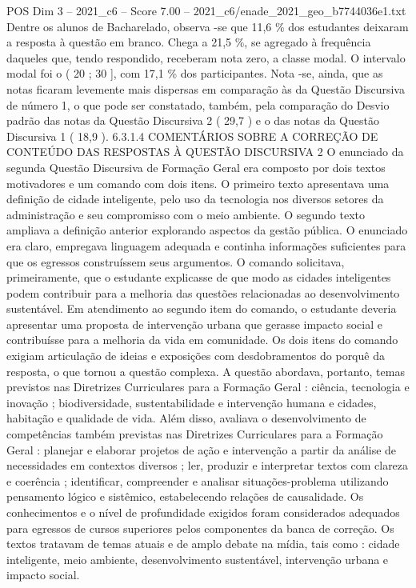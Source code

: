 \begin{textsample}{POS Dim 3 – 2021\_c6 – Score 7.00 – 2021\_c6/enade\_2021\_geo\_b7744036e1.txt}
Dentre os alunos de Bacharelado, observa -se que 11,6 \% dos estudantes deixaram a resposta à questão em branco.
Chega a 21,5 \%, se agregado à frequência daqueles que, tendo respondido, receberam nota zero, a classe modal.
O intervalo modal foi o ( 20 ; 30 ], com 17,1 \% dos participantes.
Nota -se, ainda, que as notas ficaram levemente mais dispersas em comparação às da Questão Discursiva de número 1, o que pode ser constatado, também, pela comparação do Desvio padrão das notas da Questão Discursiva 2 ( 29,7 ) e o das notas da Questão Discursiva 1 ( 18,9 ). 6.3.1.4 COMENTÁRIOS SOBRE A CORREÇÃO DE CONTEÚDO DAS RESPOSTAS À QUESTÃO DISCURSIVA 2 O enunciado da segunda Questão Discursiva de Formação Geral era composto por dois textos motivadores e um comando com dois itens.
O primeiro texto apresentava uma definição de cidade inteligente, pelo uso da tecnologia nos diversos setores da administração e seu compromisso com o meio ambiente.
O segundo texto ampliava a definição anterior explorando aspectos da gestão pública.
O enunciado era claro, empregava linguagem adequada e continha informações suficientes para que os egressos construíssem seus argumentos.
O comando solicitava, primeiramente, que o estudante explicasse de que modo as cidades inteligentes podem contribuir para a melhoria das questões relacionadas ao desenvolvimento sustentável.
Em atendimento ao segundo item do comando, o estudante deveria apresentar uma proposta de intervenção urbana que gerasse impacto social e contribuísse para a melhoria da vida em comunidade.
Os dois itens do comando exigiam articulação de ideias e exposições com desdobramentos do porquê da resposta, o que tornou a questão complexa.
A questão abordava, portanto, temas previstos nas Diretrizes Curriculares para a Formação Geral : ciência, tecnologia e inovação ; biodiversidade, sustentabilidade e intervenção humana e cidades, habitação e qualidade de vida.
Além disso, avaliava o desenvolvimento de competências também previstas nas Diretrizes Curriculares para a Formação Geral : planejar e elaborar projetos de ação e intervenção a partir da análise de necessidades em contextos diversos ; ler, produzir e interpretar textos com clareza e coerência ; identificar, compreender e analisar situações-problema utilizando pensamento lógico e sistêmico, estabelecendo relações de causalidade.
Os conhecimentos e o nível de profundidade exigidos foram considerados adequados para egressos de cursos superiores pelos componentes da banca de correção.
Os textos tratavam de temas atuais e de amplo debate na mídia, tais como : cidade inteligente, meio ambiente, desenvolvimento sustentável, intervenção urbana e impacto social.

\end{textsample}
